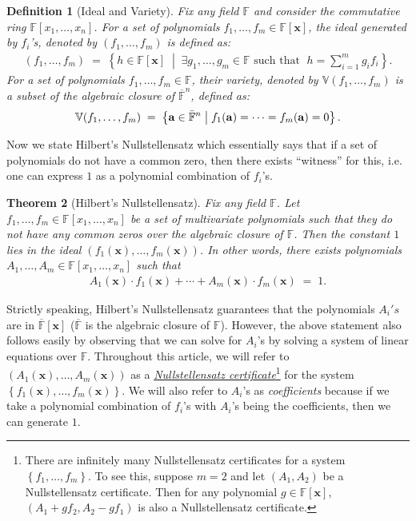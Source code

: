 \documentclass[11pt]{article}
\newtheorem{theorem}{Theorem}[section]
\newtheorem{definition}[theorem]{Definition}
\newcommand{\set}[1]{\left\{ #1 \right\}}
\newcommand{\setcond}[2]{\left\{ #1 \;\middle\vert\; #2 \right\}}
\newcommand{\F}{\mathbb{F}}
\begin{document}
\begin{definition}[Ideal and Variety]
Fix any field $\F$ and consider the commutative ring $\F[x_{1},\ldots,x_{n}]$. For a set of polynomials $f_{1},\ldots,f_{m} \in \F[\mathbf{x}]$, the ideal generated by $f_{i}$'s, denoted by $(f_{1},\ldots,f_{m})$ is defined as:
\begin{align*}
    (f_{1},\ldots,f_{m}) \; = \; \setcond{h \in \F[\mathbf{x}]}{\exists g_{1},\ldots,g_{m} \in \F \text{ such that } \; h = \sum_{i=1}^{m} g_{i}f_{i} }.
\end{align*}
For a set of polynomials $f_{1},\ldots,f_{m} \in \F$, their variety, denoted by $\mathbb{V}(f_{1},\ldots,f_{m})$ is a subset of the algebraic closure of $\overline{\F}^{n}$, defined as:
\begin{align*}
    \mathbb{V}(f_{1},\ldots,f_{m}) \; = \; \setcond{\mathbf{a} \in \Bar{\F}^{n}}{f_{1}(\mathbf{a}) = \cdots = f_{m}(\mathbf{a}) = 0}.
\end{align*}
\end{definition}

\noindent
Now we state Hilbert's Nullstellensatz which essentially says that if a set of polynomials do not have a common zero, then there exists ``witness'' for this, i.e. one can express $1$ as a polynomial combination of $f_{i}$'s.\\

\begin{theorem}[Hilbert's Nullstellensatz]\label{thm:nullstellensatz}
Fix any field $\F$. Let $f_{1}, \ldots, f_{m} \in \F[x_{1},\ldots,x_{n}]$ be a set of multivariate polynomials such that they do not have any common zeros over the algebraic closure of $\F$. Then the constant $1$ lies in the ideal $(f_{1}(\mathbf{x}), \ldots, f_{m}(\mathbf{x}))$. In other words, there exists polynomials $A_{1},\ldots,A_{m} \in \F[x_{1},\ldots,x_{n}]$ such that
\begin{align*}
    A_{1}(\mathbf{x}) \cdot f_{1}(\mathbf{x}) + \cdots + A_{m}(\mathbf{x}) \cdot f_{m}(\mathbf{x}) \; = \; 1.
\end{align*}
\end{theorem}

\noindent
Strictly speaking, Hilbert's Nullstellensatz guarantees that the polynomials $A_{i}'s$ are in $\overline{\F}[\mathbf{x}]$ ($\overline{\F}$ is the algebraic closure of $\F$). However, the above statement also follows easily by observing that we can solve for $A_{i}$'s by solving a system of linear equations over $\F$. Throughout this article, we will refer to $(A_{1}(\mathbf{x}), \ldots, A_{m}(\mathbf{x}))$ as a \underline{\emph{Nullstellensatz certificate}}\footnote{There are infinitely many Nullstellensatz certificates for a system $\set{f_{1},\ldots,f_{m}}$. To see this, suppose $m = 2$ and let $(A_{1},A_{2})$ be a Nullstellensatz certificate. Then for any polynomial $g \in \F[\mathbf{x}]$, $(A_{1} + gf_{2}, A_{2} - gf_{1})$ is also a Nullstellensatz certificate.} for the system $\set{f_{1}(\mathbf{x}), \ldots, f_{m}(\mathbf{x})}$. We will also refer to $A_{i}$'s as \emph{coefficients} because if we take a polynomial combination of $f_{i}$'s with $A_{i}$'s being the coefficients, then we can generate $1$.
\end{document}
